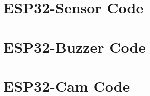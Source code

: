 \documentclass[12pt]{article}        %
\begin{document}
    \pagebreak
    \appendix

    \section{ESP32-Sensor Code}
    
    \pagebreak

    \section{ESP32-Buzzer Code}
    
    \pagebreak

    \section{ESP32-Cam Code}
    
    \pagebreak
\end{document}
